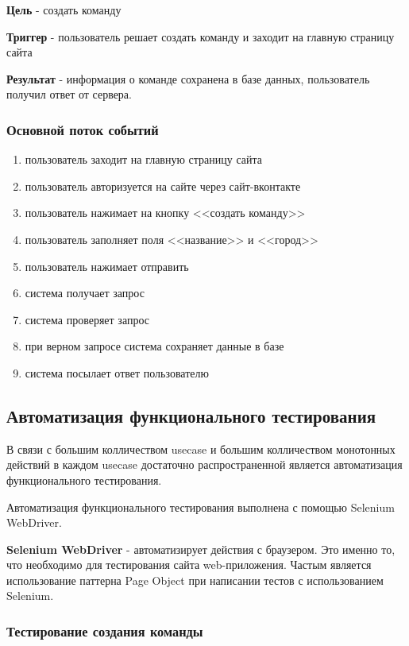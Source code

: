 \textbf{Цель} - создать команду

\textbf{Триггер} - пользователь решает создать команду и заходит на главную страницу сайта

\textbf{Результат} - информация о команде сохранена в базе данных, пользователь получил ответ от сервера.

\subsubsection{Основной поток событий}
\begin{enumerate}
	\item пользователь заходит на главную страницу сайта
	\item пользователь авторизуется на сайте через сайт-вконтакте
	\item пользователь нажимает на кнопку <<создать команду>>
	\item пользователь заполняет поля <<название>> и <<город>>
	\item пользователь нажимает отправить
	\item система получает запрос
	\item система проверяет запрос
	\item при верном запросе система сохраняет данные в базе
	\item система посылает ответ пользователю
\end{enumerate}

\subsection{Автоматизация функционального тестирования}

В связи с большим колличеством usecase и большим колличеством монотонных действий в каждом usecase достаточно распространенной является автоматизация функционального тестирования.

Автоматизация функционального тестирования выполнена с помощью Selenium WebDriver.  

\textbf{Selenium WebDriver} - автоматизирует действия с браузером. Это именно то, что необходимо для тестирования сайта web-приложения. Частым является использование паттерна Page Object при написании тестов с использованием Selenium.

\subsubsection{Тестирование создания команды}

